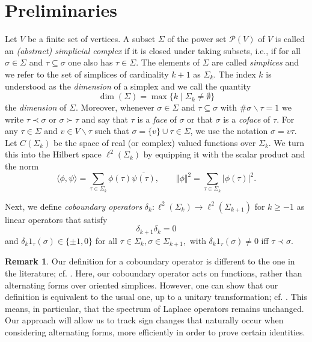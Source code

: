 \documentclass[10pt]{amsart}
\theoremstyle{definition}
\newtheorem*{remark}{Remark}
\begin{document}
\section{Preliminaries}\label{prelim}
Let $V$ be a finite set of vertices. A subset $\Sigma$ of the power set $ \mathcal{P}(V)$ of $V$ is called an \textit{(abstract) simplicial complex} if it is closed under taking subsets, i.e., if for all $\sigma\in \Sigma$ and $\tau\subseteq\sigma$ one also has $\tau\in\Sigma.$ The elements of $\Sigma$ are called \textit{simplices} and we refer to the set of simplices of cardinality $k+1$ as $\Sigma_k.$ The index $k$ is understood as the \textit{dimension} of a simplex and we call the quantity
\[\dim(\Sigma) = \max\lbrace k\mid\Sigma_k\neq \emptyset\rbrace\] the \textit{dimension} of $\Sigma.$ Moreover, whenever $\sigma\in\Sigma$ and $\tau\subseteq\sigma$ with $\#\sigma\backslash\tau = 1$ we write $\tau\prec\sigma$ or $\sigma\succ\tau$ and say that $\tau$ is a \textit{face} of $\sigma$ or that $\sigma$ is a \textit{coface} of $\tau.$ For any $\tau\in\Sigma$ and $v\in V\backslash\tau$ such that $\sigma = \lbrace v\rbrace\cup\tau\in\Sigma$, we use the notation $\sigma = v\tau.$\\

Let $C(\Sigma_k)$ be the space of real (or complex) valued functions over $\Sigma_k.$ We turn this into the Hilbert space $\ell^2(\Sigma_k)$ by equipping it with the scalar product and  the norm
$$\langle \phi,\psi\rangle =\sum_{\tau\in\Sigma_k}\phi(\tau)\overline{\psi(\tau)},\qquad \Vert\phi\Vert^2 = \sum_{\tau\in\Sigma_k}\vert\phi(\tau)\vert^2.$$


Next, we define \textit{coboundary operators} $\delta_k:\ell^2(\Sigma_k)\rightarrow\ell^2(\Sigma_{k+1})$ for $k\geq -1$ as linear operators that satisfy \[\delta_{k+1}\delta_k = 0\] and $\delta_k1_\tau(\sigma)\in\lbrace\pm1,0\rbrace$ for all $\tau\in\Sigma_k,\sigma\in\Sigma_{k+1},$ with $\delta_k1_\tau(\sigma)\neq0$ iff $\tau\prec\sigma.$
\begin{remark}
    Our definition for a coboundary operator is different to the one in the literature; cf. \cite{AharoniBergerMeshulam,HJ,Parzanchevski,RT,zhang2026upper}. Here, our coboundary operator acts on functions, rather than alternating forms over oriented simplices. However, one can show that our definition is equivalent to the usual one, up to a unitary transformation; cf. \cite[Section 2.2]{BK}. This means, in particular, that the spectrum of Laplace operators remains unchanged. Our approach will allow us to track sign changes that naturally occur when considering alternating forms, more efficiently in order to prove certain identities.
\end{remark}
\end{document}
